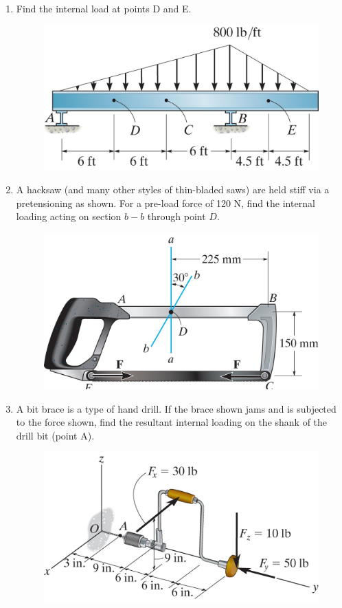 \documentclass[12pt, oneside]{article}
\begin{document}
\begin{enumerate}
	\item %
		Find the internal load at points D and E.
		\begin{figure}[H]
			\centering
			\includegraphics[width=0.6\linewidth]{beam}
			\label{fig:beam}
		\end{figure}
	
	\item %
		A hacksaw (and many other styles of thin-bladed saws) are held stiff via a pretensioning as shown.
		For a pre-load force of 120 N, find the internal loading acting on section $b-b$ through point $D$.
		\begin{figure}[H]
			\centering
			\includegraphics[width=0.6\linewidth]{hacksaw}
			\label{fig:hacksaw}
		\end{figure}
		\pagebreak

	\item %
		A bit brace is a type of hand drill.
		If the brace shown jams and is subjected to the force shown, find the resultant internal loading on the shank of the drill bit (point A).
		\begin{figure}[H]
			\centering
			\includegraphics[width=0.6\linewidth]{brace}
			\label{fig:brace}
		\end{figure}


\end{enumerate}
\end{document}
